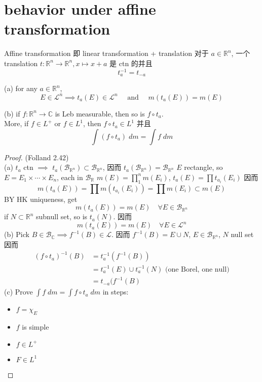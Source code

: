 \documentclass[lang=cn,11pt]{elegantbook}
\begin{document}
\section{behavior under affine transformation}
Affine transformation 即 linear transformation + translation
对于 $a \in \mathbb{R}^n$, 一个 translation $t: \mathbb{R}^n \to \mathbb{R}^n, x \mapsto x+ a$ 是 ctn 的并且 \[
t_a^{-1} = t_{-a}
\]

\begin{theorem}
(a) for any $a \in \mathbb{R}^n$, 
\[
E \in \mathcal{L}^n \implies  t_a(E) \in \mathcal{L}^n \quad \text{ and }\quad m(t_a(E)) = m(E)
\]

(b) if $f: \mathbb{R}^n \to \mathbb{C}$ is Leb measurable, then so is $f \circ t_a$. \\
More, if $f \in L^+$ or $f \in L^1$, then $f \circ t_a \in L^1$ 并且  \[
\int (f \circ t_a) \; dm = \int f \; dm
\]
\end{theorem}
\begin{proof}
    (Folland 2.42)\\
    (a)
    $t_a $ ctn $\implies$ $t_a(\mathcal{B}_{\mathbb{R}^n}) \subset \mathcal{B}_{\mathbb{R}^n}$, 因而  $t_a(\mathcal{B}_{\mathbb{R}^n})=\mathcal{B}_{\mathbb{R}^n}$
    $E$ rectangle, so $E = E_1 \times \cdots \times E_n $, each in $\mathcal{B}_\mathbb{R}$
    $m(E) = \prod_1^n m(E_i)$, $t_a(E) = \prod t_{a_i} (E_i)$ 
    因而  \[
    m(t_a(E)) = \prod m(t_{a_i} (E_i)) = \prod m(E_i) \subset m(E)
    \]
    BY HK uniqueness, get \[
    m(t_a(E)) = m(E) \quad \forall E \in \mathcal{B}_{\mathbb{R}^n}
    \]
    if $N \subset \mathbb{R}^n$ subnull set, so is $t_a(N)$. 因而 \[
    m(t_a(E)) = m(E) \quad \forall E \in \mathcal{L}^n 
    \]
    (b) Pick $B \in \mathcal{B}_\mathbb{C} \implies f^{-1}(B) \in \mathcal{L}$.
    因而 $f^{-1}(B) = E \cup N$, $E \in \mathcal{B}_{\mathbb{R}^n}$, $N$ null set
    因而 \begin{align}
        (f\circ t_a)^{-1}(B) & = t_a^{-1}( f^{-1}(B)) \\&= t_a^{-1}(E) \cup t_a^{-1}(N) \text{ (one Borel, one null)} \\
        &= t_{-a}(f^{-1}(B)
    \end{align}
(c) Prove $\int f \; dm = \int f \circ t_a \;d m$ in steps: \begin{itemize}
    \item $f = \chi_E$
    \item $f$ is simple 
    \item $f \in L^+$
    \item $F \in L^1$
\end{itemize}    
\end{proof}
\end{document}
